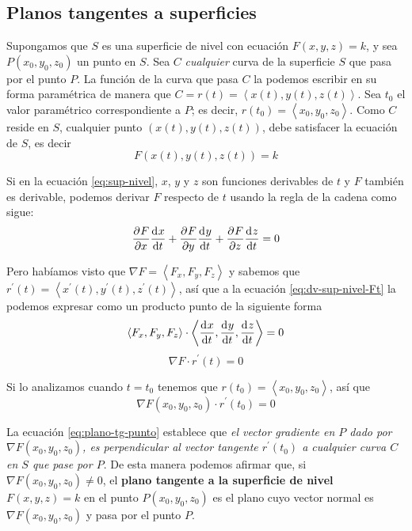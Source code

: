 \documentclass[12pt]{article}
\begin{document}
\subsection{Planos tangentes a superficies}
Supongamos que $ S $ es una superficie de nivel con ecuación $ F(x,y,z)=k $, y sea $ P(x_{0},y_{0},z_{0}) $ un punto en $ S $. Sea $ C $ \textit{cualquier} curva de la superficie $ S $ que pasa por el punto $ P $. La función de la curva que pasa $ C $ la podemos escribir en su forma paramétrica de manera que $ C = r(t) = \left\langle x(t),y(t),z(t) \right\rangle $. Sea $ t_{0} $ el valor paramétrico correspondiente a $ P $; es decir, $ r(t_{0}) = \left\langle x_{0},y_{0},z_{0} \right\rangle $. Como $ C $ reside en $ S $, cualquier punto $ \left(x(t),y(t),z(t)\right) $, debe satisfacer la ecuación de $ S $, es decir
\begin{equation}\label{eq:sup-nivel}
F\left(x(t),y(t),z(t)\right) = k
\end{equation}

Si en la ecuación \ref{eq:sup-nivel}, $ x $, $ y $ y $ z $ son funciones derivables de $ t $ y $ F $ también es derivable, podemos derivar $ F $ respecto de $ t $ usando la regla de la cadena como sigue:
\begin{equation}\label{eq:dv-sup-nivel-Ft}
\pdv[]{F}{x}\dv[]{x}{t} + \pdv[]{F}{y}\dv[]{y}{t} + \pdv[]{F}{z}\dv[]{z}{t} = 0
\end{equation}

Pero habíamos visto que $ \nabla F = \left\langle F_{x}, F_{y}, F_{z} \right\rangle $ y sabemos que $ r^{\prime}(t)=\left\langle x^{\prime}(t),y^{\prime}(t),z^{\prime}(t) \right\rangle $, así que a la ecuación \ref{eq:dv-sup-nivel-Ft} la podemos expresar como un producto punto de la siguiente forma
\[
  \left\langle F_{x},F_{y},F_{z} \right\rangle\cdot \left\langle \dv[]{x}{t},\dv[]{y}{t},\dv[]{z}{t} \right\rangle = 0
\]
\begin{equation}\label{eq:grad-plano-tg}
  \nabla F\cdot r^{\prime}(t)=0
\end{equation}

Si lo analizamos cuando $ t = t_{0} $ tenemos que $ r(t_{0})=\left\langle x_{0},y_{0},z_{0} \right\rangle $, así que
\begin{equation}\label{eq:plano-tg-punto}
  \nabla F(x_{0},y_{0},z_{0})\cdot r^{\prime}(t_{0})=0
\end{equation}

La ecuación \ref{eq:plano-tg-punto} establece que \textit{el vector gradiente en $ P $ dado por $ \nabla F(x_{0},y_{0},z_{0}) $, es perpendicular al vector tangente $ r^{\prime}(t_{0}) $ a cualquier curva $ C $ en $ S $ que pase por $ P $}. De esta manera podemos afirmar que, si $ \nabla F(x_{0},y_{0},z_{0})\neq 0 $, el \textbf{plano tangente a la superficie de nivel} $ F(x,y,z) = k $ en el punto $ P(x_{0},y_{0},z_{0}) $ es el plano cuyo vector normal es $ \nabla F(x_{0},y_{0},z_{0}) $ y pasa por el punto $ P $.
\end{document}
